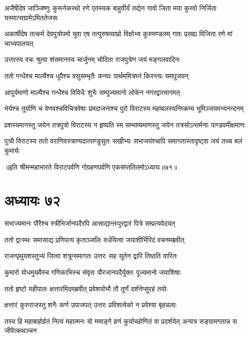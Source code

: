 \threelineshloka
{अजैषीदेष जाञ्जिष्णुः कुरूनेकरथो रणे}
{एतस्यक बाहुवीर्यं तद्येन गावो जिता मया}
{कुरवो निर्जिता यस्मात्सग्रामेऽमिततेजसः}


\threelineshloka
{अकार्षीदेष तत्कर्म देवपुत्रोपमो युवा}
{एष तत्पुरुषव्याघ्रो विक्षोभ्य कुरुमण्डलम्}
{गावः प्रसह्य विजिता रणे मां चाभ्यपालयत्}



\twolineshloka
{उत्तरस्य वचः श्रुत्वा शंसमानस्य चार्जुनम्}
{चोदिता राजपुत्रेण जयं मङ्गलवादिनः}


\twolineshloka
{ततो गन्धैश्च माल्यैश्च धूपैश्च वसुसम्भृतैः}
{कन्याः पार्थममित्रघ्नं किरन्त्यः समपूजयन्}


\twolineshloka
{आपूर्यमाणो माल्यैश्च गन्धैश्च विविधैः शुभैः}
{सम्पूज्यमानो लोकेन नगरद्वारमागमत्}


\twolineshloka
{भेर्यश्च तूर्याणि च वेणवश्चविचित्रवेषाः प्रमदाजनाश्च}
{पुरो विराटस्य महाबलस्यनिष्क्रम्य भूमिञ्जयमभ्यनन्दनम्}


\twolineshloka
{प्रशस्यमानस्तु जयेन तत्रपुत्रो विराटस्य न हृष्यति स्म}
{सम्भाष्यमाणस्तु जयेन तत्रसोऽन्तर्मनाः पाण्डवमीक्षमाणः}


\twolineshloka
{पुत्र्यै विराटस्य ततो वराणिवस्त्राण्यदात्पाण्डुसुतः सखीभ्यः}
{सभाजयंश्चापि समागतास्तादृष्ट्वा जयं तच्च बलं कुमार्यः}

॥इति श्रीमन्महाभारते विराटपर्वणि गोग्रहणपर्वणि एकसप्ततितमोऽध्यायः॥७१॥

\chapter{अध्यायः ७२}

\twolineshloka
{सभाज्यमानः पौरैश्च स्त्रीभिर्जानपदैरपि}
{आसाद्यान्तःपुरद्वारं पित्रे सम्प्रत्यवेदयत्}


\twolineshloka
{ततो द्वाःस्थः समासाद्य प्रणिपत्य कृताञ्जलिः}
{वर्धयित्वा जयाशीर्भिरिदं वचनमब्रवीत्}


\twolineshloka
{राजन्पृथुयशस्तुभ्यं जित्वा शत्रून्समागतः}
{उत्तरः सह सूतेन द्वारि तिष्ठति वारितः}


\twolineshloka
{कुमारो योधमुख्यैस्च गणिकाभिस्च संवृतः}
{पौरजानपदैर्युक्तः पूज्यमानो जयाशिषाः}


\twolineshloka
{ततो हृष्टो महीपालः क्षत्तारमिदमब्रवीत्}
{प्रवेशयोभौ तौ तूर्णं दर्शनेप्सुरहं तयोः}


\twolineshloka
{क्षत्तारं कुरुराजस्तु शनैः कर्ण उपाजपत्}
{उत्तरः प्रविशत्वेको न प्रवेश्या बृहन्नलाः}


\threelineshloka
{तस्य हि महाबाहोर्व्रतं नित्यं महात्मनः}
{यो ममाङ्गे व्रणं कुर्याच्छोणितं वा प्रदर्शयेत्}
{अन्यत्र सङ्ग्रामगतान्न स जीवेत्कथञ्चन}


